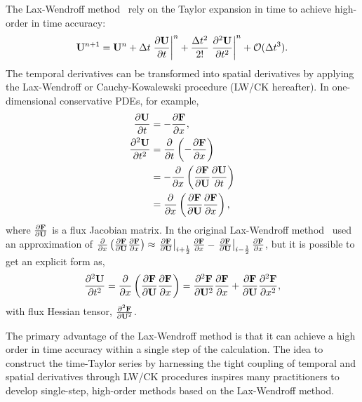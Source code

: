 The Lax-Wendroff method~\cite{lax1959systems} rely on the Taylor expansion in time
to achieve high-order in time accuracy:
\begin{equation}\label{eq:lw_time_taylor}
    \bU^{n + 1} = \bU^{n} + \dt \left. \pd{\bU}{t} \right|^{n} + \frac{\dt^{2}}{2!} \left.\pdd{\bU}{t}\right|^{n} + \mathcal{O}(\dt^{3}).
\end{equation}
The temporal derivatives can be transformed into spatial derivatives
by applying the Lax-Wendroff or Cauchy-Kowalewski procedure (LW/CK hereafter).
In one-dimensional conservative PDEs, for example,
\begin{equation}\label{eq:lw_1d_ck_procedure}
    \begin{split}
        \pd{\bU}{t} &= -\pd{\bF}{x}, \\
        \pdd{\bU}{t} &= \pd{}{t} \left( -\pd{\bF}{x}\right) \\
                     &= -\pd{}{x} \left( \pd{\bF}{\bU} \pd{\bU}{t} \right) \\
                     &= \pd{}{x} \left( \pd{\bF}{\bU} \pd{\bF}{x} \right),
    \end{split}
\end{equation}
where \( \pd{\bF}{\bU} \) is a flux Jacobian matrix.
In the original Lax-Wendroff method~\cite{lax1959systems} used an approximation of \( \pd{}{x} \left( \pd{\bF}{\bU} \pd{\bF}{x} \right) \approx
\left.\pd{\bF}{\bU} \right|_{\iph} \pd{\bF}{x} - \left.\pd{\bF}{\bU} \right|_{\imh} \pd{\bF}{x} \),
but it is possible to get an explicit form as,
\begin{equation}\label{}
    \pdd{\bU}{t} = \pd{}{x} \left( \pd{\bF}{\bU} \pd{\bF}{x} \right) = \pdd{\bF}{\bU} \pd{\bF}{x} + \pd{\bF}{\bU} \pdd{\bF}{x},
\end{equation}
with flux Hessian tensor, \( \pdd{\bF}{\bU} \).

The primary advantage of the Lax-Wendroff method is that
it can achieve a high order in time accuracy within a single step of the calculation.
The idea to construct the time-Taylor series by harnessing the tight coupling of temporal
and spatial derivatives through LW/CK procedures inspires many practitioners
to develop single-step, high-order methods based on the Lax-Wendroff method.


